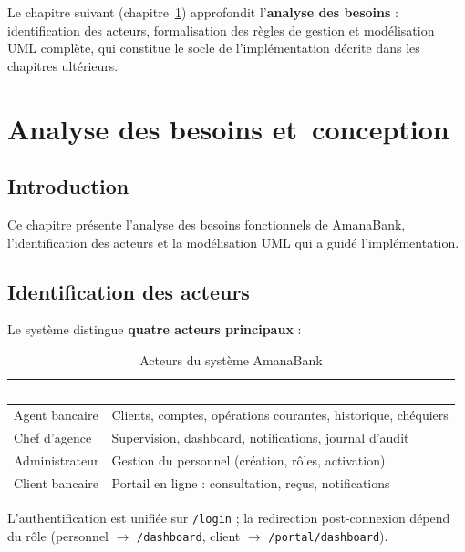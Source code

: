 \documentclass[11pt,a4paper,oneside]{report}
\newcommand{\tabhead}[1]{\textcolor{white}{\textbf{#1}}}
\newcommand{\nomapplication}{AmanaBank}
\begin{document}
Le chapitre suivant (chapitre~\ref{ch:conception}) approfondit l'\textbf{analyse des besoins} : identification des acteurs, formalisation des règles de gestion et modélisation UML complète, qui constitue le socle de l'implémentation décrite dans les chapitres ultérieurs.

\chapter{Analyse des besoins et~conception}
\label{ch:conception}

\section{Introduction}

Ce chapitre présente l'analyse des besoins fonctionnels de \nomapplication, l'identification des acteurs et la modélisation UML qui a guidé l'implémentation.

\section{Identification des acteurs}

Le système distingue \textbf{quatre acteurs principaux} :

\begin{table}[H]
    \centering
    \caption{Acteurs du système \nomapplication}
    \label{tab:acteurs}
    \begin{tabular}{@{}lp{9cm}@{}}
        \rowcolor{AmanaBrown}
        \tabhead{Acteur} & \tabhead{Rôle et responsabilités} \\
        \midrule
        Agent bancaire & Clients, comptes, opérations courantes, historique, chéquiers \\
        Chef d'agence & Supervision, dashboard, notifications, journal d'audit \\
        Administrateur & Gestion du personnel (création, rôles, activation) \\
        Client bancaire & Portail en ligne : consultation, reçus, notifications \\
        \bottomrule
    \end{tabular}
\end{table}

L'authentification est unifiée sur \texttt{/login} ; la redirection post-connexion dépend du rôle (personnel $\rightarrow$ \texttt{/dashboard}, client $\rightarrow$ \texttt{/portal/dashboard}).
\end{document}

